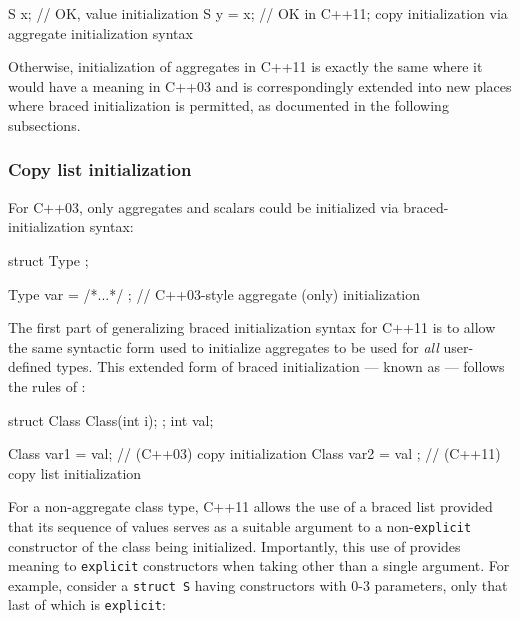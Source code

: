 \begin{emcppslisting}[emcppsbatch=e4]
S x{};      // OK, value initialization
S y = {x};  // OK in C++11; copy initialization via aggregate initialization syntax
\end{emcppslisting}
    

\noindent Otherwise, initialization of aggregates in C++11 is exactly the same
where it would have a meaning in C++03 and is correspondingly extended
into new places where braced initialization is permitted, as documented
in the following subsections.

\subsubsection[Copy list initialization]{Copy list initialization}\label{copy-list-initialization}

For C++03, only aggregates and scalars could be initialized via
braced-initialization syntax:

\begin{emcppshiddenlisting}[emcppsbatch=e5]
struct Type {};
\end{emcppshiddenlisting}
\begin{emcppslisting}[emcppsbatch=e5]
Type var = { /*...*/ };  // C++03-style aggregate (only) initialization
\end{emcppslisting}
    

\noindent The first part of generalizing braced initialization syntax for C++11 is
to allow the same syntactic form used to initialize aggregates to be
used for \emph{all} user-defined types. This extended form of braced
initialization --- known as  ---
follows the rules of :

\begin{emcppshiddenlisting}[emcppsbatch=e6]
struct Class { Class(int i); };
int val;
\end{emcppshiddenlisting}
\begin{emcppslisting}[emcppsbatch=e6]
Class var1 = val;      // (C++03) copy initialization
Class var2 = { val };  // (C++11) copy list initialization
\end{emcppslisting}
    

\noindent For a non-aggregate class type, C++11 allows the use of a braced list
provided that its sequence of values serves as a suitable argument to a
non-\lstinline!explicit! constructor of the class being initialized.
Importantly, this use of 
provides meaning to \lstinline!explicit! constructors when taking other
than a single argument. For example, consider a
\lstinline!struct!~\lstinline!S! having constructors with 0-3 parameters, only
that last of which is \lstinline!explicit!:

